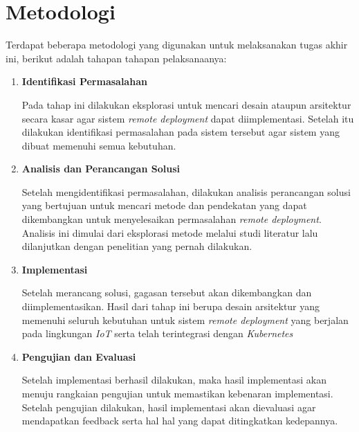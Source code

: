 \section{Metodologi}

Terdapat beberapa metodologi yang digunakan untuk melaksanakan tugas akhir ini, berikut adalah tahapan tahapan pelaksanaanya:
\begin{enumerate}
  \item \textbf{Identifikasi Permasalahan}

        Pada tahap ini dilakukan eksplorasi untuk mencari desain ataupun arsitektur secara kasar agar sistem \textit{remote deployment} dapat diimplementasi. Setelah itu dilakukan identifikasi permasalahan pada sistem tersebut agar sistem yang dibuat memenuhi semua kebutuhan.

  \item \textbf{Analisis dan Perancangan Solusi}

        Setelah mengidentifikasi permasalahan, dilakukan analisis perancangan solusi yang bertujuan untuk mencari metode dan pendekatan yang dapat dikembangkan untuk menyelesaikan permasalahan \textit{remote deployment}. Analisis ini dimulai dari eksplorasi metode melalui studi literatur lalu dilanjutkan dengan penelitian yang pernah dilakukan.

  \item \textbf{Implementasi}

        Setelah merancang solusi, gagasan tersebut akan dikembangkan dan diimplementasikan. Hasil dari tahap ini berupa desain arsitektur yang memenuhi seluruh kebutuhan untuk sistem \textit{remote deployment} yang berjalan pada lingkungan \textit{IoT} serta telah terintegrasi dengan \textit{Kubernetes}

  \item \textbf{Pengujian dan Evaluasi}

        Setelah implementasi berhasil dilakukan, maka hasil implementasi akan menuju rangkaian pengujian untuk memastikan kebenaran implementasi. Setelah pengujian dilakukan, hasil implementasi akan dievaluasi agar mendapatkan feedback serta hal hal yang dapat ditingkatkan kedepannya.

\end{enumerate}